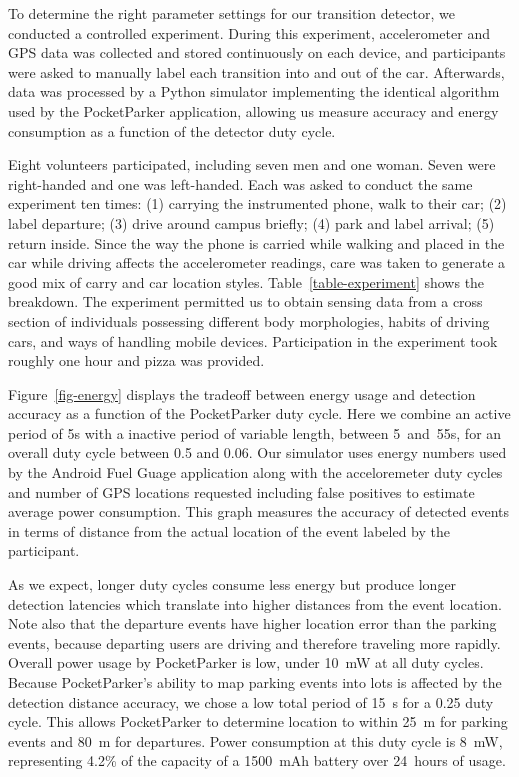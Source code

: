 

To determine the right parameter settings for our transition detector, we
conducted a controlled experiment. During this experiment, accelerometer and
GPS data was collected and stored continuously on each device, and
participants were asked to manually label each transition into and out of the
car. Afterwards, data was processed by a Python simulator implementing the
identical algorithm used by the PocketParker application, allowing us measure
accuracy and energy consumption as a function of the detector duty cycle.

Eight volunteers participated, including seven men and one woman. Seven were
right-handed and one was left-handed. Each was asked to conduct the same
experiment ten times: (1) carrying the instrumented phone, walk to their car;
(2) label departure; (3) drive around campus briefly; (4) park and label
arrival; (5) return inside. Since the way the phone is carried while walking
and placed in the car while driving affects the accelerometer readings, care
was taken to generate a good mix of carry and car location styles.
Table~\ref{table-experiment} shows the breakdown. The experiment permitted us
to obtain sensing data from a cross section of individuals possessing
different body morphologies, habits of driving cars, and ways of handling
mobile devices. Participation in the experiment took roughly one hour and
pizza was provided.

Figure~\ref{fig-energy} displays the tradeoff between energy usage and
detection accuracy as a function of the PocketParker duty cycle. Here we
combine an active period of 5s with a inactive period of variable length,
between 5~and~55s, for an overall duty cycle between 0.5 and 0.06. Our
simulator uses energy numbers used by the Android Fuel Guage application
along with the acceloremeter duty cycles and number of GPS locations
requested including false positives to estimate average power consumption.
This graph measures the accuracy of detected events in terms of distance from
the actual location of the event labeled by the participant.

As we expect, longer duty cycles consume less energy but produce longer
detection latencies which translate into higher distances from the event
location. Note also that the departure events have higher location error than
the parking events, because departing users are driving and therefore
traveling more rapidly. Overall power usage by PocketParker is low, under
10~mW at all duty cycles. Because PocketParker's ability to map parking
events into lots is affected by the detection distance accuracy, we chose a
low total period of 15~s for a 0.25 duty cycle. This allows PocketParker to
determine location to within 25~m for parking events and 80~m for departures.
Power consumption at this duty cycle is 8~mW, representing 4.2\% of the
capacity of a 1500~mAh battery over 24~hours of usage.

